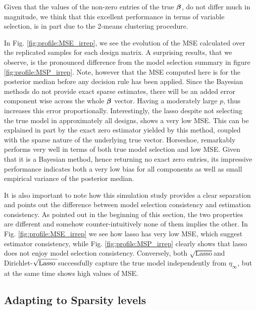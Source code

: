 \documentclass[ba]{imsart}
\def\sql{$\sqrt{\text{Lasso}}$}
\def\sqdl{Dirichlet-$\sqrt{\text{\rm{Lasso} }}$}
\begin{document}
Given that the values of the non-zero entries of the true $\boldsymbol{\beta}$, do not differ much in magnitude, we think that this excellent performance in terms of variable selection, is in part due to the 2-means clustering procedure. 

In Fig. \ref{fig:profile:MSE_irrep}, we see the evolution of the MSE calculated over the replicated samples for each design matrix. A surprising results, that we observe, is the pronounced difference from the model selection summary in figure \ref{fig:profile:MSP_irrep}. Note, however that the MSE computed here is for the posterior median before any decision rule has been applied. Since the Bayesian methods do not provide exact sparse estimates, there will be an added error component wise across the whole $\boldsymbol{\beta}$ vector. Having a moderately large $p$, thus increases this error proportionally. Interestingly, the lasso despite not selecting the true model in approximately all designs, shows a very low MSE. This can be explained in part by the exact zero estimator yielded by this method, coupled with the sparse nature of the underlying true vector. Horseshoe, remarkably performs very well in terms of both true model selection and low MSE. Given that it is a Bayesian method, hence returning no exact zero entries, its impressive performance indicates both a very low bias for all components as well as small empirical variance of the posterior median.


It is also important to note how this simulation study provides a clear separation and points out the difference between model selection consistency and estimation consistency. As pointed out in the beginning of this section, the two properties are different and somehow counter-intuitively none of them implies the other. In Fig. \ref{fig:profile:MSE_irrep} we see how lasso has very low MSE, which suggest estimator consistency, while Fig. \ref{fig:profile:MSP_irrep} clearly shows that lasso does not enjoy model selection consistency. Conversely, both \sql and \sqdl successfully capture the true model independently from $\eta_{\infty}$, but at the same time shows high values of MSE.



\subsection{Adapting to Sparsity levels}
\end{document}
